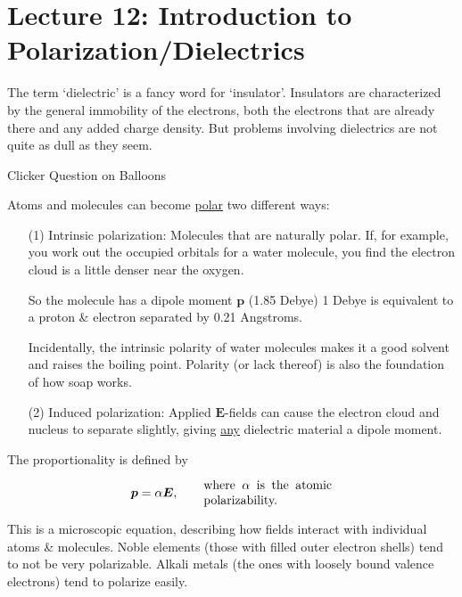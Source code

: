 \documentclass{article}
\numberwithin{equation}{section}
\begin{document}
\newpage

\section*{Lecture 12: Introduction to Polarization/Dielectrics}
\setcounter{page}{1}

The term `dielectric' is a fancy word for `insulator'. Insulators are characterized by the general immobility of the electrons, both the electrons that are already there and any added charge density. But problems involving dielectrics are not quite as dull as they seem.

Clicker Question on Balloons

Atoms and molecules can become \underline{polar} two different ways:

\begin{enumerate}

\item[(1)] Intrinsic polarization: Molecules that are naturally polar. If, for example, you work out the occupied orbitals for a water molecule, you find the electron cloud is a little denser near the oxygen. 

So the molecule has a dipole moment $\bm{p}$ (1.85 Debye) 1 Debye is equivalent to a proton \& electron separated by 0.21 Angstroms.

Incidentally, the intrinsic polarity of water molecules makes it a good solvent and raises the boiling point. Polarity (or lack thereof) is also the foundation of how soap works.

\item[(2)] Induced polarization: Applied $\bm{E}$-fields can cause the electron cloud and nucleus to separate slightly, giving \underline{any} dielectric material a dipole moment.

\end{enumerate}

The proportionality is defined by 

\begin{equation*}
    \bm{p} = \alpha \bm{E}, \qquad \parbox[c]{0.3\textwidth}{where $\alpha$ is the atomic polarizability.}
\end{equation*}

This is a microscopic equation, describing how fields interact with individual atoms \& molecules. Noble elements (those with filled outer electron shells) tend to not be very polarizable. Alkali metals (the ones with loosely bound valence electrons) tend to polarize easily.
\end{document}
